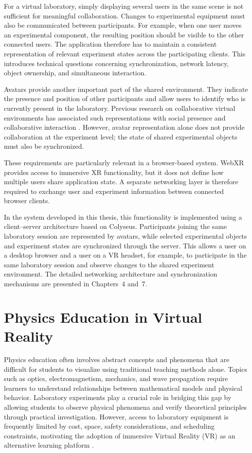 For a virtual laboratory, simply displaying several users in the same scene is not sufficient for meaningful collaboration. Changes to experimental equipment must also be communicated between participants. For example, when one user moves an experimental component, the resulting position should be visible to the other connected users. The application therefore has to maintain a consistent representation of relevant experiment states across the participating clients. This introduces technical questions concerning synchronization, network latency, object ownership, and simultaneous interaction.

Avatars provide another important part of the shared environment. They indicate the presence and position of other participants and allow users to identify who is currently present in the laboratory. Previous research on collaborative virtual environments has associated such representations with social presence and collaborative interaction \cite{radianti2020review}. However, avatar representation alone does not provide collaboration at the experiment level; the state of shared experimental objects must also be synchronized.

These requirements are particularly relevant in a browser-based system. WebXR provides access to immersive XR functionality, but it does not define how multiple users share application state. A separate networking layer is therefore required to exchange user and experiment information between connected browser clients.

In the system developed in this thesis, this functionality is implemented using a client--server architecture based on Colyseus. Participants joining the same laboratory session are represented by avatars, while selected experimental objects and experiment states are synchronized through the server. This allows a user on a desktop browser and a user on a VR headset, for example, to participate in the same laboratory session and observe changes to the shared experiment environment. The detailed networking architecture and synchronization mechanisms are presented in Chapters~4 and~7.

\section{Physics Education in Virtual Reality}

Physics education often involves abstract concepts and phenomena that are difficult for students to visualize using traditional teaching methods alone. Topics such as optics, electromagnetism, mechanics, and wave propagation require learners to understand relationships between mathematical models and physical behavior. Laboratory experiments play a crucial role in bridging this gap by allowing students to observe physical phenomena and verify theoretical principles through practical investigation. However, access to laboratory equipment is frequently limited by cost, space, safety considerations, and scheduling constraints, motivating the adoption of immersive Virtual Reality (VR) as an alternative learning platform \cite{radianti2020review}.

